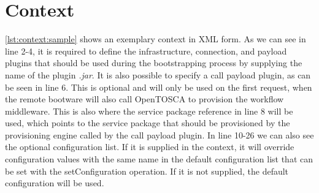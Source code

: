 \section{Context}
\label{implementation:context}

\vspace*{\baselineskip}

\autoref{lst:context:sample} shows an exemplary context in XML form.
As we can see in line 2-4, it is required to define the infrastructure, connection, and payload plugins that should be used during the bootstrapping process by supplying the name of the plugin \textit{.jar}.
It is also possible to specify a call payload plugin, as can be seen in line 6.
This is optional and will only be used on the first request, when the remote bootware will also call OpenTOSCA to provision the workflow middleware.
This is also where the service package reference in line 8 will be used, which points to the service package that should be provisioned by the provisioning engine called by the call payload plugin.
In line 10-26 we can also see the optional configuration list.
If it is supplied in the context, it will override configuration values with the same name in the default configuration list that can be set with the setConfiguration operation.
If it is not supplied, the default configuration will be used.
